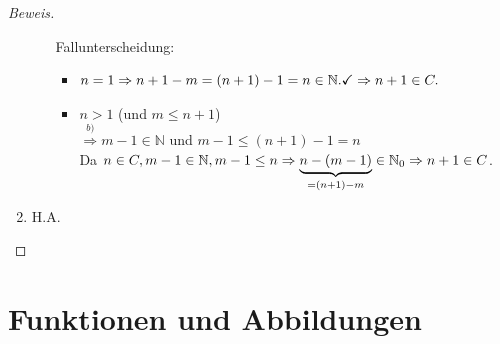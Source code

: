 \documentclass[12pt,a4paper,titlepage]{article} %
\theoremstyle{definition}
\theoremstyle{remark}
\newenvironment{bew}{\begin{proof}[Beweis]}{\end{proof}}
\begin{document}
\begin{bew}
\begin{enumerate}
\begin{enumerate}
		Fallunterscheidung: 
		\begin{itemize}
			\item $n=1 \Rightarrow n+1-m=(n+1)-1=n\in\mathbb{N}.\checkmark\\
			\Rightarrow n+1\in C.$
			\item $n > 1$ (und $m \leq n+1$)\\
			$\overset{b)}{\Rightarrow} m-1\in \mathbb{N}$ und $m-1 \leq (n+1)-1 = n$\\%
			Da $n\in C, m-1\in\mathbb{N}, m-1\leq n \Rightarrow \underbrace{n-(m-1)}_{=(n+1)-m} \in \mathbb{N}_0\\
			\Rightarrow n+1\in C$.
		\end{itemize}
	\end{enumerate}
	\item H.A.
\end{enumerate}
\end{bew}
\section{Funktionen und Abbildungen}
\end{document}
